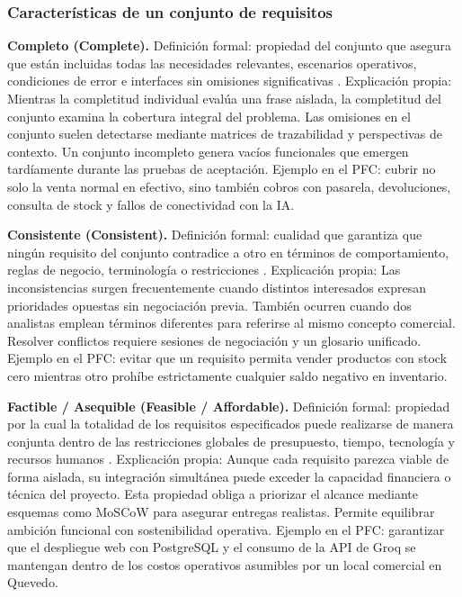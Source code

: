 \documentclass[onecolumn,12pt]{IEEEtran}
\begin{document}
	\subsubsection*{Caracter\'isticas de un conjunto de requisitos}
	
	\textbf{Completo (Complete).} Definici\'on formal: propiedad del conjunto que asegura que est\'an incluidas todas las necesidades relevantes, escenarios operativos, condiciones de error e interfaces sin omisiones significativas \cite{iso29148,pohl2025}. Explicaci\'on propia: Mientras la completitud individual eval\'ua una frase aislada, la completitud del conjunto examina la cobertura integral del problema. Las omisiones en el conjunto suelen detectarse mediante matrices de trazabilidad y perspectivas de contexto. Un conjunto incompleto genera vac\'ios funcionales que emergen tard\'iamente durante las pruebas de aceptaci\'on. Ejemplo en el PFC: cubrir no solo la venta normal en efectivo, sino tambi\'en cobros con pasarela, devoluciones, consulta de stock y fallos de conectividad con la IA.
	
	\textbf{Consistente (Consistent).} Definici\'on formal: cualidad que garantiza que ning\'un requisito del conjunto contradice a otro en t\'erminos de comportamiento, reglas de negocio, terminolog\'ia o restricciones \cite{iso29148,ireb2023}. Explicaci\'on propia: Las inconsistencias surgen frecuentemente cuando distintos interesados expresan prioridades opuestas sin negociaci\'on previa. Tambi\'en ocurren cuando dos analistas emplean t\'erminos diferentes para referirse al mismo concepto comercial. Resolver conflictos requiere sesiones de negociaci\'on y un glosario unificado. Ejemplo en el PFC: evitar que un requisito permita vender productos con stock cero mientras otro proh\'ibe estrictamente cualquier saldo negativo en inventario.
	
	\textbf{Factible / Asequible (Feasible / Affordable).} Definici\'on formal: propiedad por la cual la totalidad de los requisitos especificados puede realizarse de manera conjunta dentro de las restricciones globales de presupuesto, tiempo, tecnolog\'ia y recursos humanos \cite{iso29148}. Explicaci\'on propia: Aunque cada requisito parezca viable de forma aislada, su integraci\'on simult\'anea puede exceder la capacidad financiera o t\'ecnica del proyecto. Esta propiedad obliga a priorizar el alcance mediante esquemas como MoSCoW para asegurar entregas realistas. Permite equilibrar ambici\'on funcional con sostenibilidad operativa. Ejemplo en el PFC: garantizar que el despliegue web con PostgreSQL y el consumo de la API de Groq se mantengan dentro de los costos operativos asumibles por un local comercial en Quevedo.
	
\end{document}
